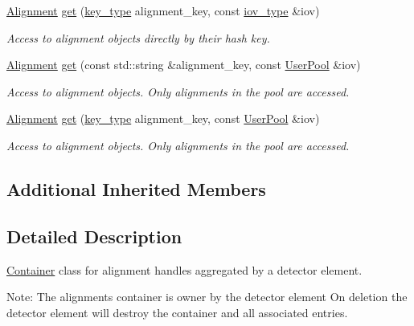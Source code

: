 \begin{DoxyCompactItemize}
\hyperlink{class_d_d4hep_1_1_alignments_1_1_alignment}{Alignment} \hyperlink{class_d_d4hep_1_1_alignments_1_1_container_a9ce366840ca326bf5258e6ac94537048}{get} (\hyperlink{class_d_d4hep_1_1_alignments_1_1_container_a4101ffa946cedbaf996682533e57c44e}{key\+\_\+type} alignment\+\_\+key, const \hyperlink{class_d_d4hep_1_1_alignments_1_1_container_a0da2fec1e4433deea86defda82886128}{iov\+\_\+type} \&iov)
\begin{DoxyCompactList}\small\item\em Access to alignment objects directly by their hash key. \end{DoxyCompactList}\item 
\hyperlink{class_d_d4hep_1_1_alignments_1_1_alignment}{Alignment} \hyperlink{class_d_d4hep_1_1_alignments_1_1_container_a6a977251f8ba2b86cd21a81e25af2eab}{get} (const std\+::string \&alignment\+\_\+key, const \hyperlink{class_d_d4hep_1_1_conditions_1_1_user_pool}{User\+Pool} \&iov)
\begin{DoxyCompactList}\small\item\em Access to alignment objects. Only alignments in the pool are accessed. \end{DoxyCompactList}\item 
\hyperlink{class_d_d4hep_1_1_alignments_1_1_alignment}{Alignment} \hyperlink{class_d_d4hep_1_1_alignments_1_1_container_a36da0db1c28a345f4363738dca05c023}{get} (\hyperlink{class_d_d4hep_1_1_alignments_1_1_container_a4101ffa946cedbaf996682533e57c44e}{key\+\_\+type} alignment\+\_\+key, const \hyperlink{class_d_d4hep_1_1_conditions_1_1_user_pool}{User\+Pool} \&iov)
\begin{DoxyCompactList}\small\item\em Access to alignment objects. Only alignments in the pool are accessed. \end{DoxyCompactList}\end{DoxyCompactItemize}
\subsection*{Additional Inherited Members}


\subsection{Detailed Description}
\hyperlink{class_d_d4hep_1_1_alignments_1_1_container}{Container} class for alignment handles aggregated by a detector element. 

Note\+: The alignments container is owner by the detector element On deletion the detector element will destroy the container and all associated entries.


